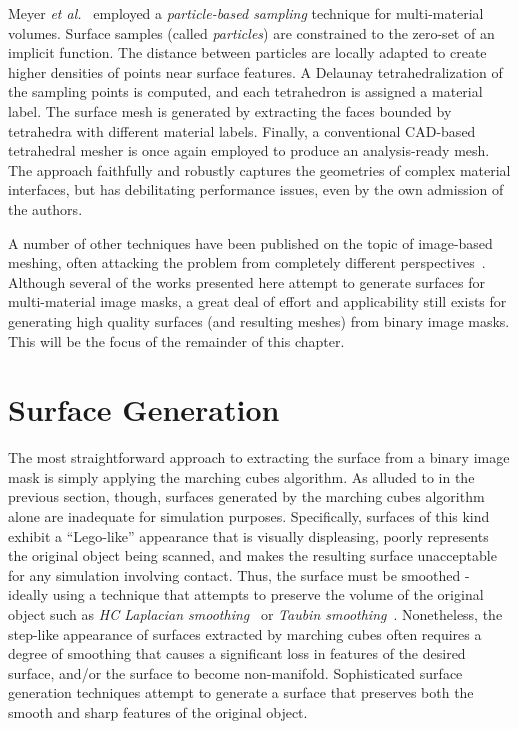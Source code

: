Meyer \textit{et al.}~\cite{meyer_2008} employed a \textit{particle-based sampling} technique for multi-material volumes. Surface samples (called \textit{particles}) are constrained to the zero-set of an implicit function. The distance between particles are locally adapted to create higher densities of points near surface features. A Delaunay tetrahedralization of the sampling points is computed, and each tetrahedron is assigned a material label. The surface mesh is generated by extracting the faces bounded by tetrahedra with different material labels. Finally, a conventional CAD-based tetrahedral mesher is once again employed to produce an analysis-ready mesh. The approach faithfully and robustly captures the geometries of complex material interfaces, but has debilitating performance issues, even by the own admission of the authors.

A number of other techniques have been published on the topic of image-based meshing, often attacking the problem from completely different perspectives~\cite{bronson_2014,fang_2009,boissonnat_2009,zhao_2016}. Although several of the works presented here attempt to generate surfaces for multi-material image masks, a great deal of effort and applicability still exists for generating high quality surfaces (and resulting meshes) from binary image masks. This will be the focus of the remainder of this chapter.

\section{Surface Generation}
\label{Surface Generation}

The most straightforward approach to extracting the surface from a binary image mask is simply applying the marching cubes algorithm. As alluded to in the previous section, though, surfaces generated by the marching cubes algorithm alone are inadequate for simulation purposes. Specifically, surfaces of this kind exhibit a ``Lego-like'' appearance that is visually displeasing, poorly represents the original object being scanned, and makes the resulting surface unacceptable for any simulation involving contact. Thus, the surface must be smoothed - ideally using a technique that attempts to preserve the volume of the original object such as \textit{HC Laplacian smoothing}~\cite{vollmer_1999} or \textit{Taubin smoothing}~\cite{taubin_1995}. Nonetheless, the step-like appearance of surfaces extracted by marching cubes often requires a degree of smoothing that causes a significant loss in features of the desired surface, and/or the surface to become non-manifold. Sophisticated surface generation techniques attempt to generate a surface that preserves both the smooth and sharp features of the original object.

